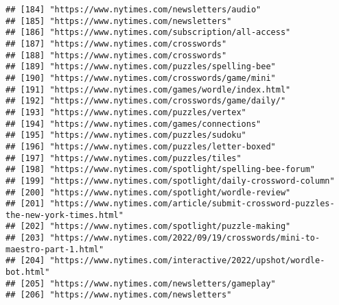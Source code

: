 \documentclass[
]{article}
\begin{document}
\begin{verbatim}
## [184] "https://www.nytimes.com/newsletters/audio"                                                                 
## [185] "https://www.nytimes.com/newsletters"                                                                       
## [186] "https://www.nytimes.com/subscription/all-access"                                                           
## [187] "https://www.nytimes.com/crosswords"                                                                        
## [188] "https://www.nytimes.com/crosswords"                                                                        
## [189] "https://www.nytimes.com/puzzles/spelling-bee"                                                              
## [190] "https://www.nytimes.com/crosswords/game/mini"                                                              
## [191] "https://www.nytimes.com/games/wordle/index.html"                                                           
## [192] "https://www.nytimes.com/crosswords/game/daily/"                                                            
## [193] "https://www.nytimes.com/puzzles/vertex"                                                                    
## [194] "https://www.nytimes.com/games/connections"                                                                 
## [195] "https://www.nytimes.com/puzzles/sudoku"                                                                    
## [196] "https://www.nytimes.com/puzzles/letter-boxed"                                                              
## [197] "https://www.nytimes.com/puzzles/tiles"                                                                     
## [198] "https://www.nytimes.com/spotlight/spelling-bee-forum"                                                      
## [199] "https://www.nytimes.com/spotlight/daily-crossword-column"                                                  
## [200] "https://www.nytimes.com/spotlight/wordle-review"                                                           
## [201] "https://www.nytimes.com/article/submit-crossword-puzzles-the-new-york-times.html"                          
## [202] "https://www.nytimes.com/spotlight/puzzle-making"                                                           
## [203] "https://www.nytimes.com/2022/09/19/crosswords/mini-to-maestro-part-1.html"                                 
## [204] "https://www.nytimes.com/interactive/2022/upshot/wordle-bot.html"                                           
## [205] "https://www.nytimes.com/newsletters/gameplay"                                                              
## [206] "https://www.nytimes.com/newsletters"                                                                       

\end{verbatim}
\end{document}
